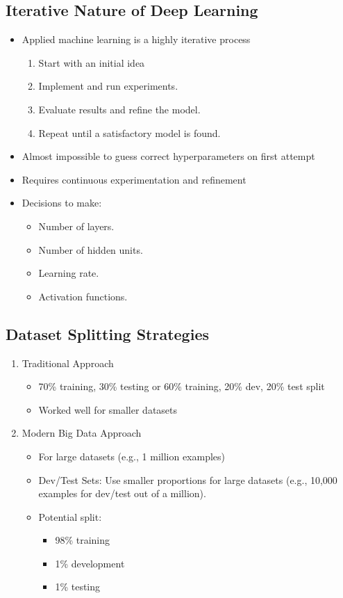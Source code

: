 \documentclass[letterpaper,12pt,notitlepage,twoside]{report}
\begin{document}
\subsection{Iterative Nature of Deep Learning}
\begin{itemize}[leftmargin=*,  nosep]
    \item Applied machine learning is a highly iterative process
	\begin{enumerate}[nosep]
	\item Start with an initial idea
	\item Implement and run experiments.
	\item Evaluate results and refine the model.
	\item Repeat until a satisfactory model is found.
	\end{enumerate}
    \item Almost impossible to guess correct hyperparameters on first attempt
    \item Requires continuous experimentation and refinement
    \item Decisions to make:
	\begin{itemize}[nosep]
	\item Number of layers.
	\item Number of hidden units.
	\item Learning rate.
	\item Activation functions.
	\end{itemize}
\end{itemize}

\subsection{Dataset Splitting Strategies}
\begin{enumerate}[leftmargin=*,  nosep]
    \item Traditional Approach
    \begin{itemize}[nosep]
        \item 70\% training, 30\% testing or 60\% training, 20\% dev, 20\% test split 
        \item Worked well for smaller datasets
    \end{itemize}
    
    \item Modern Big Data Approach
    \begin{itemize}[leftmargin=*,  nosep]
        \item For large datasets (e.g., 1 million examples)
        \item Dev/Test Sets: Use smaller proportions for large datasets (e.g., 10,000 examples for dev/test out of a million).
        \item Potential split: 
        \begin{itemize}[nosep]
            \item 98\% training
            \item 1\% development
            \item 1\% testing
        \end{itemize}
    \end{itemize}
\end{enumerate}
\end{document}
